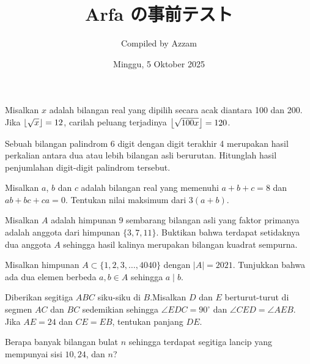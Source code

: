 \documentclass[11pt]{article}
\title{Arfa の事前テスト}
\begin{document}
\begin{CJK*}{UTF8}{min}
	
	\date{Minggu, 5 Oktober 2025}
	\author{Compiled by Azzam}
	\maketitle
	
	\begin{soalbaru}
	Misalkan $x$ adalah bilangan real yang dipilih secara acak diantara 100 dan 200. Jika $\left\lfloor \sqrt{x} \right\rfloor=12$, carilah peluang terjadinya $\left\lfloor \sqrt{100x} \right\rfloor=120$.
	\end{soalbaru}

    \begin{soalbaru}
        Sebuah bilangan palindrom 6 digit dengan digit terakhir 4 merupakan hasil perkalian antara dua atau lebih bilangan asli berurutan. Hitunglah hasil penjumlahan digit-digit palindrom tersebut.
    \end{soalbaru}

    \begin{soalbaru}
        Misalkan $a$, $b$ dan $c$ adalah bilangan real yang memenuhi $a + b + c = 8$ dan $ab + bc + ca = 0$.
Tentukan nilai maksimum dari $3(a + b)$.
    \end{soalbaru}

    \begin{soalbaru}
    Misalkan $A$ adalah himpunan 9 sembarang bilangan asli yang faktor primanya adalah anggota dari himpunan $\{3,7,11\}$. Buktikan bahwa terdapat setidaknya dua anggota $A$ sehingga hasil kalinya merupakan bilangan kuadrat sempurna.
\end{soalbaru}

\begin{soalbaru}
    Misalkan himpunan $A \subset \{1,2,3,\dots,4040\}$ dengan $|A| = 2021$. Tunjukkan bahwa ada dua elemen berbeda $a,b \in A$ sehingga $a \mid b$.
\end{soalbaru}
	
	\begin{soalbaru}
	Diberikan segitiga $ABC$ siku-siku di $B$.Misalkan $D$ dan $E$ berturut-turut di segmen $AC$ dan $BC$ sedemikian sehingga $\angle EDC= 90^\circ$ dan $\angle CED = \angle AEB$. Jika $AE = 24$ dan $CE=EB$, tentukan panjang $DE$.
	\end{soalbaru}
	
	\begin{soalbaru}
	Berapa banyak bilangan bulat $n$ sehingga terdapat segitiga lancip yang mempunyai sisi $10,24$, dan $n$?
	\end{soalbaru}


\end{CJK*}
\end{document}
